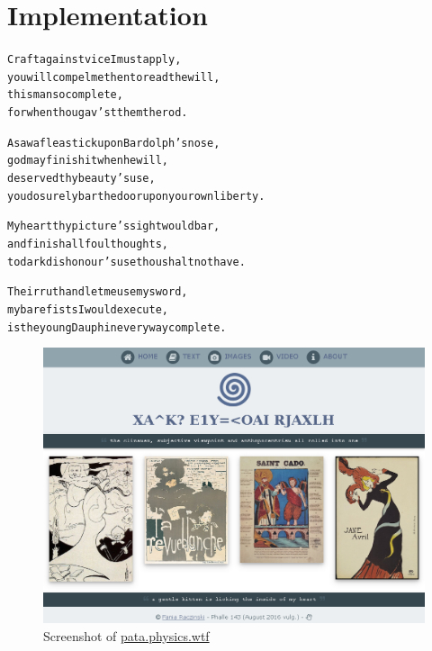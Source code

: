 
\chapter{Implementation}
\label{ch:implementation}

\startcontents[chapters]

\vfill

\begin{alltt}\sffamily
Craft against vice I must apply,
you will compel me then to read the will,
this man so complete,
for when thou gav'st them the rod.

A saw a flea stick upon Bardolph's nose,
god may finish it when he will,
deserved thy beauty's use,
you do surely bar the door upon your own liberty.

My heart thy picture's sight would bar,
and finish all foul thoughts,
to dark dishonour's use thou shalt not have.

Their ruth and let me use my sword,
my bare fists I would execute,
is the young Dauphin every way complete.
\end{alltt}

\newpage
\minicontents
\spirals

\begin{figure}[!htbp] %
  \centering
  \includegraphics[width=0.95\linewidth]{images/fullscreenshot}
\caption[Screenshot of \url{pata.physics.wtf}]{Screenshot of \url{pata.physics.wtf}\footnotemark}
\label{img:fullscreenshot}
\end{figure}

